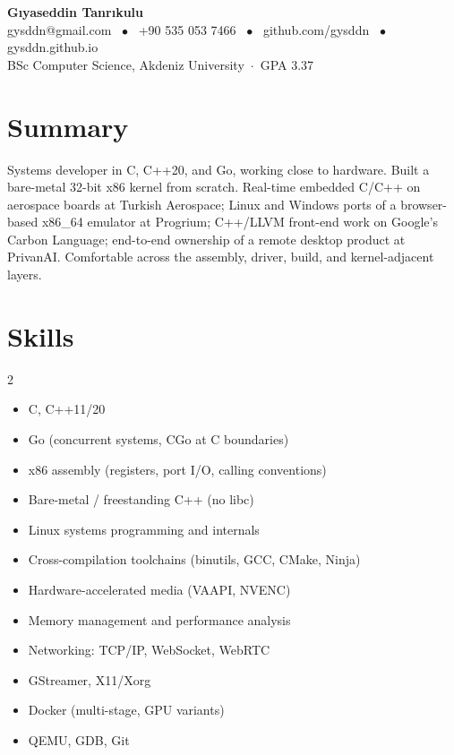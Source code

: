 \documentclass[a4paper,11pt]{article}
\begin{document}
\begin{center}
  {\fontsize{22pt}{26pt}\selectfont\bfseries\color{accent} Gıyaseddin Tanrıkulu}\\[4pt]
  {\small\color{subtle} gysddn@gmail.com \, $\bullet$ \, +90 535 053 7466 \, $\bullet$ \, github.com/gysddn \, $\bullet$ \, gysddn.github.io}\\[2pt]
  {\small\color{subtle} BSc Computer Science, Akdeniz University \,$\cdot$\, GPA 3.37}
\end{center}
\vspace{2pt}

\section{Summary}
Systems developer in C, C++20, and Go, working close to hardware. Built a bare-metal 32-bit x86 kernel from scratch. Real-time embedded C/C++ on aerospace boards at Turkish Aerospace; Linux and Windows ports of a browser-based x86\_64 emulator at Progrium; C++/LLVM front-end work on Google's Carbon Language; end-to-end ownership of a remote desktop product at PrivanAI. Comfortable across the assembly, driver, build, and kernel-adjacent layers.

\section{Skills}
\begin{multicols}{2}
\begin{itemize}[leftmargin=14pt, label=\textbullet, itemsep=1pt, topsep=2pt, parsep=0pt]
    \item C, C++11/20
    \item Go (concurrent systems, CGo at C boundaries)
    \item x86 assembly (registers, port I/O, calling conventions)
    \item Bare-metal / freestanding C++ (no libc)
    \item Linux systems programming and internals
    \item Cross-compilation toolchains (binutils, GCC, CMake, Ninja)
    \item Hardware-accelerated media (VAAPI, NVENC)
    \item Memory management and performance analysis
    \item Networking: TCP/IP, WebSocket, WebRTC
    \item GStreamer, X11/Xorg
    \item Docker (multi-stage, GPU variants)
    \item QEMU, GDB, Git
\end{itemize}
\end{multicols}
\end{document}
